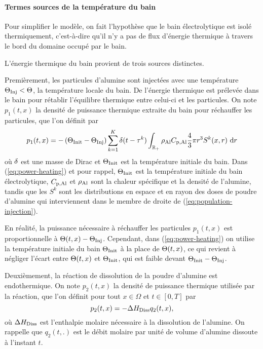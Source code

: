 \paragraph{Termes sources de la température du bain}
Pour simplifier le modèle, on fait l'hypothèse que le bain
électrolytique est isolé thermiquement, c'est-à-dire qu'il n'y a pas
de flux d'énergie thermique à travers le bord du domaine occupé par le
bain.

L'énergie thermique du bain provient de trois sources distinctes.

Premièrement, les particules d'alumine sont injectées avec
une température $\Theta_\text{Inj} < \Theta$, la température locale du
bain. De l'énergie thermique est prélevée dans le bain pour rétablir
l'équilibre thermique entre celui-ci et les particules. On note $p_1(t,
x)$ la densité de puissance thermique extraite du bain pour réchauffer
les particules, que l'on définit par
\begin{equation}\label{eq:power-heating}
  p_1(t, x) = -\left( \Theta_\text{Init}-\Theta_\text{Inj} \right)\sum_{k = 1}^{K}\delta(t -
  \tau^k)\int_{{\mathbb R_+}}\rho_\mathrm{Al}C_{\mathrm{p,Al}}\frac{4}{3}\pi r^3 S^k(x, r)\,\,\mathrm dr
\end{equation}
où $\delta$ est une masse de Dirac et $\Theta_\text{Init}$ est la température
initiale du bain. Dans (\ref{eq:power-heating}) et pour rappel, $\Theta_\text{Init}$ est la
température initiale du bain électrolytique, $C_{\mathrm{p,Al}}$ et
$\rho_\mathrm{Al}$ sont la chaleur spécifique et la densité de
l'alumine, tandis que les $S^k$ sont les distributions en espace et en
rayon des doses de poudre d'alumine qui interviennent dans le membre
de droite de (\ref{eq:population-injection}).

\begin{remarque}
  En réalité, la puissance nécessaire à réchauffer les particules
  $p_1(t, x)$ est proportionnelle à ${\Theta(t, x) -
    \Theta_\text{Inj}}$. Cependant, dans (\ref{eq:power-heating}) on utilise la
  température initiale du bain $\Theta_\text{Init}$ à la place de
  $\Theta(t, x)$, ce qui revient à négliger l'écart entre
  $\Theta(t, x)$ et $\Theta_\text{Init}$, qui est faible devant ${\Theta_\text{Init} -
  \Theta_\text{Inj}}$.
\end{remarque}

Deuxièmement, la réaction de dissolution de la poudre d'alumine est
endothermique. On note $p_2(t, x)$ la densité de puissance thermique
utilisée par la réaction, que l'on définit pour tout $x\in\Omega$ et
$t\in[0, T]$ par
\begin{equation}\label{eq:p2}
p_2(t, x) = - \Delta H_\text{Diss} q_2(t, x),
\end{equation}
où $\Delta H_\text{Diss}$ est l'enthalpie molaire nécessaire à
la dissolution de l'alumine. On rappelle que $q_2(t, .)$ est le
débit molaire par unité de volume d'alumine dissoute à l'instant $t$.

